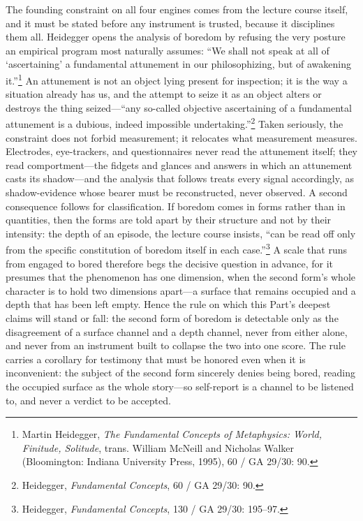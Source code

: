 \documentclass{article}
\begin{document}
The founding constraint on all four engines comes from the lecture course itself, and it must be stated before any instrument is trusted, because it disciplines them all. Heidegger opens the analysis of boredom by refusing the very posture an empirical program most naturally assumes: ``We shall not speak at all of `ascertaining' a fundamental attunement in our philosophizing, but of awakening it.''\footnote{Martin Heidegger, \textit{The Fundamental Concepts of Metaphysics: World, Finitude, Solitude}, trans. William McNeill and Nicholas Walker (Bloomington: Indiana University Press, 1995), 60 / GA 29/30: 90.} An attunement is not an object lying present for inspection; it is the way a situation already has us, and the attempt to seize it as an object alters or destroys the thing seized---``any so-called objective ascertaining of a fundamental attunement is a dubious, indeed impossible undertaking.''\footnote{Heidegger, \textit{Fundamental Concepts}, 60 / GA 29/30: 90.} Taken seriously, the constraint does not forbid measurement; it relocates what measurement measures. Electrodes, eye-trackers, and questionnaires never read the attunement itself; they read comportment---the fidgets and glances and answers in which an attunement casts its shadow---and the analysis that follows treats every signal accordingly, as shadow-evidence whose bearer must be reconstructed, never observed. A second consequence follows for classification. If boredom comes in forms rather than in quantities, then the forms are told apart by their structure and not by their intensity: the depth of an episode, the lecture course insists, ``can be read off only from the specific constitution of boredom itself in each case.''\footnote{Heidegger, \textit{Fundamental Concepts}, 130 / GA 29/30: 195--97.} A scale that runs from engaged to bored therefore begs the decisive question in advance, for it presumes that the phenomenon has one dimension, when the second form's whole character is to hold two dimensions apart---a surface that remains occupied and a depth that has been left empty. Hence the rule on which this Part's deepest claims will stand or fall: the second form of boredom is detectable only as the disagreement of a surface channel and a depth channel, never from either alone, and never from an instrument built to collapse the two into one score. The rule carries a corollary for testimony that must be honored even when it is inconvenient: the subject of the second form sincerely denies being bored, reading the occupied surface as the whole story---so self-report is a channel to be listened to, and never a verdict to be accepted.
\end{document}

